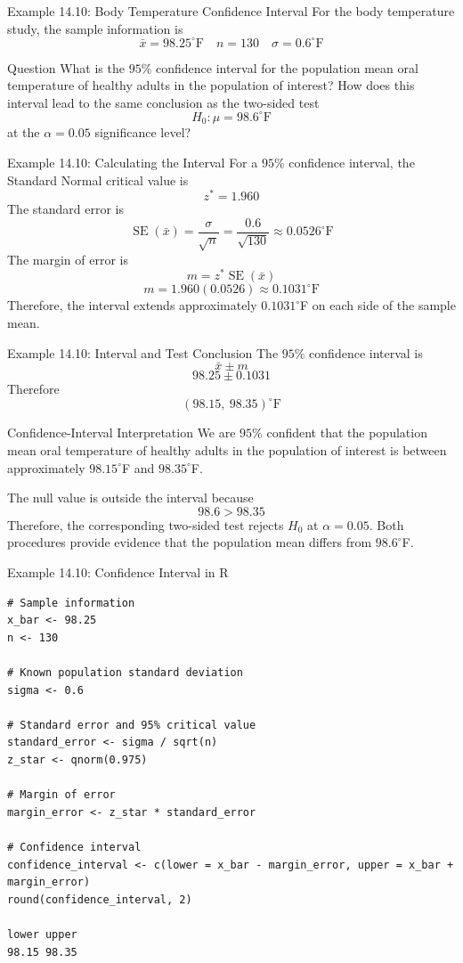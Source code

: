 \documentclass[aspectratio=169]{beamer}
\begin{document}
\begin{frame}{Example 14.10: Body Temperature Confidence Interval}
For the body temperature study, the sample information is
$$\bar{x}=98.25^\circ\text{F} \quad n=130 \quad \sigma=0.6^\circ\text{F}$$
\begin{block}{Question}
What is the $95\%$ confidence interval for the population mean oral temperature of healthy adults in the population of interest? How does this interval lead to the same conclusion as the two-sided test
$$H_0:\mu=98.6^\circ\text{F}$$
at the $\alpha=0.05$ significance level?
\end{block}
\end{frame}

\begin{frame}{Example 14.10: Calculating the Interval}
For a $95\%$ confidence interval, the Standard Normal critical value is
$$z^*=1.960$$
The standard error is
$$\operatorname{SE}(\bar{x})=\frac{\sigma}{\sqrt{n}}=\frac{0.6}{\sqrt{130}}\approx0.0526^\circ\text{F}$$
The margin of error is
$$m=z^*\operatorname{SE}(\bar{x})$$
$$m=1.960(0.0526)\approx0.1031^\circ\text{F}$$
Therefore, the interval extends approximately $0.1031^\circ$F on each side of the sample mean.
\end{frame}


\begin{frame}{Example 14.10: Interval and Test Conclusion}
The $95\%$ confidence interval is
$$\bar{x}\pm m$$
$$98.25\pm0.1031$$
Therefore
$$\boxed{(98.15,\ 98.35)^\circ\text{F}}$$

\begin{block}{Confidence-Interval Interpretation}
We are $95\%$ confident that the population mean oral temperature of healthy adults in the population of interest is between approximately $98.15^\circ$F and $98.35^\circ$F.
\end{block}
The null value is outside the interval because
$$98.6>98.35$$
Therefore, the corresponding two-sided test rejects $H_0$ at $\alpha=0.05$. Both procedures provide evidence that the population mean differs from $98.6^\circ$F.
\end{frame}


\begin{frame}[fragile]{Example 14.10: Confidence Interval in R}
\scriptsize
\begin{verbatim}
# Sample information
x_bar <- 98.25
n <- 130

# Known population standard deviation
sigma <- 0.6

# Standard error and 95% critical value
standard_error <- sigma / sqrt(n)
z_star <- qnorm(0.975)

# Margin of error
margin_error <- z_star * standard_error

# Confidence interval
confidence_interval <- c(lower = x_bar - margin_error, upper = x_bar + margin_error)
round(confidence_interval, 2)

lower upper
98.15 98.35
\end{verbatim}
\end{frame}
\end{document}
